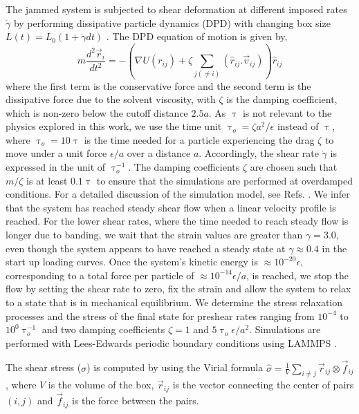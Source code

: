 \documentclass[%
preprint,
 amsmath,amssymb,
 aps,
]{revtex4-1}
\begin{document}
{{ The jammed system is subjected to shear deformation at different imposed rates $\dot{\gamma}$ by performing dissipative particle dynamics (DPD) with changing box size $L(t) = L_0 (1+\dot{\gamma} dt)$ \cite{shrivastav2016heterogeneous,vasisht2020computational}. The DPD equation of motion is given by,
\begin{equation}
m\frac{d^2\vec{r}_i}{dt^2} = -(\nabla U(r_{ij}) + \zeta \sum_{j(\neq i)} (\hat{r}_{ij}.\vec{v}_{ij}))  \hat{r}_{ij}  
\end{equation}
where the first term is the conservative force and the second term is the dissipative force due to the solvent viscosity, with $\zeta$ is the damping coefficient, which is non-zero below the cutoff distance $2.5 a$. As $\uptau$ is not relevant to the physics explored in this work, we use the time unit $\uptau_o = \zeta a^2/\epsilon$ instead of $\uptau$, where $\uptau_o = 10 \uptau$ is the time needed for a particle experiencing the drag $\zeta$ to move under a unit force $\epsilon/a$ over a distance $a$.  Accordingly, the shear rate $\dot{\gamma}$ is expressed in the unit of $\uptau_o^{-1}$. The damping coefficients
$\zeta$ are chosen such that $m/\zeta$ is at least $0.1 \uptau$ to ensure that the simulations are performed at  overdamped conditions. For a detailed discussion of the simulation model, see Refs. \cite{shrivastav2016heterogeneous,vasisht2020computational}. We infer that the system has reached steady shear  flow when a linear velocity profile is reached. For the lower shear rates, where the time needed to reach steady flow is longer due to banding, we wait that the strain values are greater than $\gamma = 3.0$, even though the system appears to have reached a steady state at $\gamma \approx 0.4$ in the start up loading curves.  
Once the system's kinetic energy is $\approx 10^{-20} \epsilon$, corresponding to a total force per particle of  $\approx 10^{-14} \epsilon/a$, is reached, we stop the flow by setting the shear rate to zero, fix the strain and allow the system to relax to a state that is in mechanical equilibrium. 
We determine the stress relaxation processes and the stress of the final state for preshear rates  ranging from $10^{-4}$ to $10^{0}  \uptau_o^{-1}$ and two damping coefficients $\zeta = 1$ and $5 \uptau_o \epsilon/a^2$. Simulations are performed with Lees-Edwards periodic boundary conditions using LAMMPS \cite{lammps}.

The shear stress ($\sigma$) is computed by using the Virial formula $\hat{\sigma} = \frac{1}{V} \sum_{i \neq j} \vec{r}_{ij} \otimes \vec{f}_{ij}$, where $V$ is the volume of the box, $\vec{r}_{ij}$ is the vector connecting the center of pairs $(i,j)$ and $\vec{f}_{ij}$ is the force between the pairs.

}}
\end{document}
